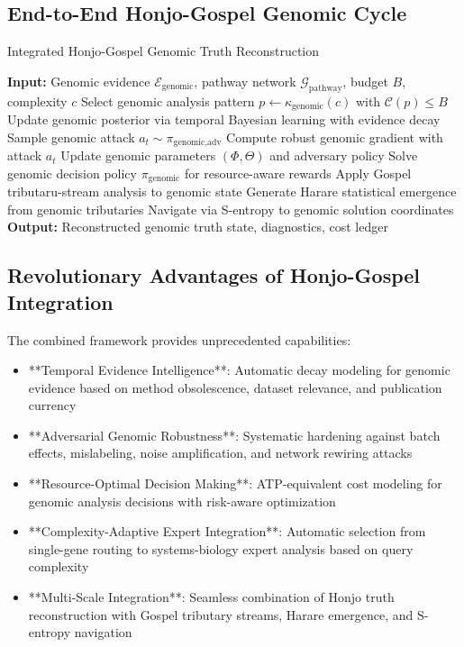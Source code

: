 \documentclass[12pt,a4paper]{article}
\begin{document}
\subsection{End-to-End Honjo-Gospel Genomic Cycle}

\begin{algorithm}
\caption{Integrated Honjo-Gospel Genomic Truth Reconstruction}
\begin{algorithmic}[1]
\State \textbf{Input:} Genomic evidence $\mathcal{E}_{\text{genomic}}$, pathway network $\mathcal{G}_{\text{pathway}}$, budget $B$, complexity $c$
\State Select genomic analysis pattern $p \gets \kappa_{\text{genomic}}(c)$ with $\mathcal{C}(p) \leq B$
\State Update genomic posterior via temporal Bayesian learning with evidence decay
    \State Sample genomic attack $a_t \sim \pi_{\text{genomic,adv}}$
    \State Compute robust genomic gradient with attack $a_t$
    \State Update genomic parameters $(\Phi,\Theta)$ and adversary policy
\EndFor
\State Solve genomic decision policy $\pi_{\text{genomic}}$ for resource-aware rewards
\State Apply Gospel tributaru-stream analysis to genomic state
\State Generate Harare statistical emergence from genomic tributaries  
\State Navigate via S-entropy to genomic solution coordinates
\State \textbf{Output:} Reconstructed genomic truth state, diagnostics, cost ledger
\end{algorithmic}
\end{algorithm}

\subsection{Revolutionary Advantages of Honjo-Gospel Integration}

The combined framework provides unprecedented capabilities:

\begin{itemize}
\item **Temporal Evidence Intelligence**: Automatic decay modeling for genomic evidence based on method obsolescence, dataset relevance, and publication currency
\item **Adversarial Genomic Robustness**: Systematic hardening against batch effects, mislabeling, noise amplification, and network rewiring attacks
\item **Resource-Optimal Decision Making**: ATP-equivalent cost modeling for genomic analysis decisions with risk-aware optimization
\item **Complexity-Adaptive Expert Integration**: Automatic selection from single-gene routing to systems-biology expert analysis based on query complexity
\item **Multi-Scale Integration**: Seamless combination of Honjo truth reconstruction with Gospel tributary streams, Harare emergence, and S-entropy navigation
\end{itemize}
\end{document}
